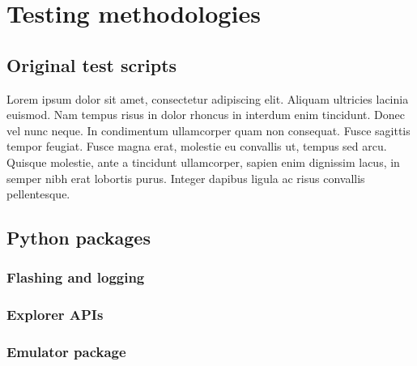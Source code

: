 
\chapter{Testing methodologies} %

\label{ch:methodologies}


\section{Original test scripts}

Lorem ipsum dolor sit amet, consectetur adipiscing elit. Aliquam ultricies lacinia euismod. Nam tempus risus in dolor rhoncus in interdum enim tincidunt. Donec vel nunc neque. In condimentum ullamcorper quam non consequat. Fusce sagittis tempor feugiat. Fusce magna erat, molestie eu convallis ut, tempus sed arcu. Quisque molestie, ante a tincidunt ullamcorper, sapien enim dignissim lacus, in semper nibh erat lobortis purus. Integer dapibus ligula ac risus convallis pellentesque.

\section{Python packages}

\subsection{Flashing and logging}

\subsection{Explorer APIs}

\subsection{Emulator package}

